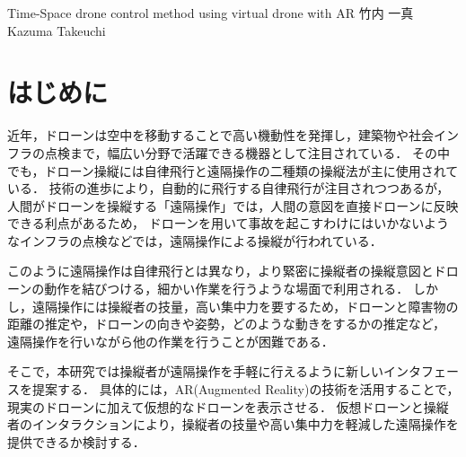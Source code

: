 \documentclass[a4paper,10pt,twocolumn,uplatex]{jsarticle}
\date{9}
\begin{document}
{Time-Space drone control method using virtual drone with AR}
{竹内 一真}
{Kazuma Takeuchi}

\section{はじめに}
近年，ドローンは空中を移動することで高い機動性を発揮し，建築物や社会インフラの点検まで，幅広い分野で活躍できる機器として注目されている．
その中でも，ドローン操縦には自律飛行と遠隔操作の二種類の操縦法が主に使用されている\cite{sample}．
技術の進歩により，自動的に飛行する自律飛行が注目されつつあるが，人間がドローンを操縦する「遠隔操作」では，人間の意図を直接ドローンに反映できる利点があるため，
ドローンを用いて事故を起こすわけにはいかないようなインフラの点検などでは，遠隔操作による操縦が行われている．
\par
このように遠隔操作は自律飛行とは異なり，より緊密に操縦者の操縦意図とドローンの動作を結びつける，細かい作業を行うような場面で利用される．
しかし，遠隔操作には操縦者の技量，高い集中力を要するため，ドローンと障害物の距離の推定や，ドローンの向きや姿勢，どのような動きをするかの推定など，
遠隔操作を行いながら他の作業を行うことが困難である\cite{teleoperate}．
\par
そこで，本研究では操縦者が遠隔操作を手軽に行えるように新しいインタフェースを提案する．
具体的には，AR(Augmented Reality)の技術を活用することで，現実のドローンに加えて仮想的なドローンを表示させる．
仮想ドローンと操縦者のインタラクションにより，操縦者の技量や高い集中力を軽減した遠隔操作を提供できるか検討する．
\par

\end{document}
